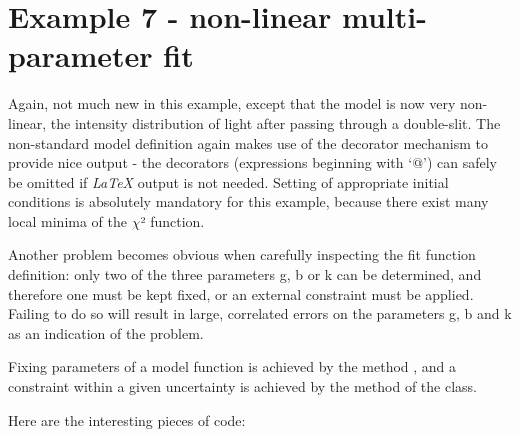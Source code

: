 \documentclass[a4paper,10pt,english]{sphinxmanual}
\begin{document}
\section{Example 7 - non-linear multi-parameter fit}
\label{index:example-7-non-linear-multi-parameter-fit}
Again, not much new in this example, except that the
model is now very non-linear, the intensity distribution
of light after passing through a double-slit. The
non-standard model definition again makes use of the
decorator mechanism to provide nice output - the decorators
(expressions beginning with `@') can safely be omitted if \emph{LaTeX}
output is not needed. Setting of appropriate initial
conditions is absolutely mandatory for this example,
because there  exist many local minima of the \(\chi\)² function.

Another problem becomes obvious when carefully inspecting
the fit function definition: only two of the three parameters g,
b or k can be determined, and therefore one must be kept fixed,
or an external constraint must be applied.
Failing to do so will result in large, correlated errors
on the parameters g, b and k as an indication of the problem.

Fixing parameters of a model function is achieved by the method
, and a constraint within a given uncertainty
is achieved by the method 
of the  class.

Here are the interesting pieces of code:
\end{document}
